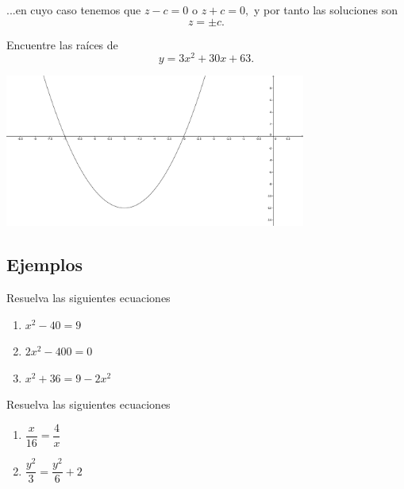 	...en cuyo caso tenemos que $z-c=0$ o $z+c=0,$
	y por tanto las soluciones son
	$$
	z=\pm c.
	$$



	\begin{problema}
		Encuentre las ra\'ices de
		$$
		y=3x^2+30x+63.
		$$ 
	\end{problema}
	



	\begin{center}
		\includegraphics[height=5cm,keepaspectratio=true]{./precalculo/IM0301.png}
	\end{center}
	




\subsection{Ejemplos}


	\begin{problema} Resuelva las siguientes ecuaciones
		\begin{enumerate}
			\item $x^{2}-40=9$
			\item $2x^{2}-400=0$
			\item $x^{2}+36=9-2x^{2}$
		\end{enumerate}
		
	\end{problema}
	



	\begin{problema} Resuelva las siguientes ecuaciones
		\begin{enumerate}
			\item $\dfrac{x}{16}=\dfrac{4}{x}$
			\item $\dfrac{y^{2}}{3}=\dfrac{y^{2}}{6}+2$
		\end{enumerate}
		
	\end{problema}
	



